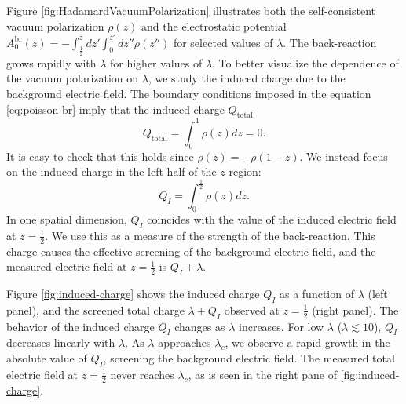 Figure \ref{fig:HadamardVacuumPolarization} illustrates both the self-consistent vacuum polarization $\rho(z)$ and the electrostatic potential $A_0^\text{br}(z) = -\int_{\frac{1}{2}}^z dz' \int_0^{z'}dz''{\rho}(z'')$ for selected values of $\lambda$. The back-reaction grows rapidly with $\lambda$ for higher values of $\lambda$. 
To better visualize the dependence of the vacuum polarization on $\lambda$, we study the induced charge due to the background electric field. The boundary conditions imposed in the equation \eqref{eq:poisson-br} imply that the induced charge $Q_{\text{total}}$
$$Q_{\text{total}} = \int_0^1 \rho(z) dz = 0.$$
It is easy to check that this holds since $\rho(z) = -\rho(1-z)$.
We instead focus on the induced charge in the left half of the $z$-region:
$$Q_{I} = \int_0^\frac{1}{2} \rho(z) dz.$$
In one spatial dimension, $Q_I$ coincides with the value of the induced electric field at $z=\frac{1}{2}$. We use this as a measure of the strength of the back-reaction. This charge causes the effective screening of the background electric field, and the measured electric field at $z=\frac{1}{2}$ is $Q_I + \lambda$. 

Figure \ref{fig:induced-charge} shows the induced charge $Q_I$  as a function of $\lambda$ (left panel), and the screened total charge $\lambda + Q_I$ observed at $z=\frac{1}{2}$ (right panel). The behavior of the induced charge $Q_I$ changes as $\lambda$ increases. For low $\lambda$ ($\lambda\lesssim10$), $Q_I$ decreases linearly with $\lambda$. As $\lambda$ approaches $\lambda_c$, we observe a rapid growth in the absolute value of $Q_I$,  screening the background electric field. The measured total electric field at $z=\frac{1}{2}$ never reaches $\lambda_c$, as is seen in the right pane of \ref{fig:induced-charge}.



 

